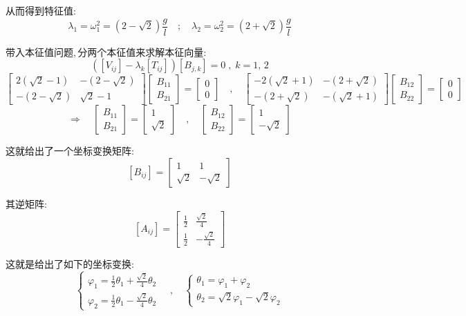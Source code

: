 从而得到特征值:
\[\lambda_1=\omega_1^2=(2-\sqrt{2})\frac{g}{l}\quad;\quad\lambda_2=\omega_2^2=(2+\sqrt{2})\frac{g}{l}\]

带入本征值问题,\,分两个本征值来求解本征向量:
\[([V_{ij}]-\lambda_k [T_{ij}])[B_{j,k}]=0\;,\;k=1,\,2\]
\[\begin{bmatrix}2(\sqrt{2}-1)&-(2-\sqrt{2})\\-(2-\sqrt{2})&\sqrt{2}-1\end{bmatrix}\begin{bmatrix}B_{11}\\B_{21}\end{bmatrix}=\begin{bmatrix}0\\0\end{bmatrix}  \quad,\quad  \begin{bmatrix}-2(\sqrt{2}+1)&-(2+\sqrt{2})\\-(2+\sqrt{2})&-(\sqrt{2}+1)\end{bmatrix}\begin{bmatrix}B_{12}\\B_{22}\end{bmatrix}=\begin{bmatrix}0\\0\end{bmatrix}\]
\[\Rightarrow \quad \begin{bmatrix}B_{11}\\B_{21}\end{bmatrix}=\begin{bmatrix}1\\\sqrt{2}\end{bmatrix}\quad,\quad \begin{bmatrix}B_{12}\\B_{22}\end{bmatrix}=\begin{bmatrix}1\\-\sqrt{2}\end{bmatrix}\]

这就给出了一个坐标变换矩阵:
\[[B_{ij}]=\begin{bmatrix}1&1\\\sqrt{2}&-\sqrt{2}\end{bmatrix}\]

其逆矩阵:
\[[A_{ij}]=\begin{bmatrix}\frac{1}{2}&\frac{\sqrt{2}}{4}\\\frac{1}{2}&-\frac{\sqrt{2}}{4}\end{bmatrix}\]

这就是给出了如下的坐标变换:
\[\left\{\begin{array}{l}\varphi_1=\frac{1}{2}\theta_1+\frac{\sqrt{2}}{4}\theta_2\\ \varphi_2=\frac{1}{2}\theta_1-\frac{\sqrt{2}}{4}\theta_2\end{array}\right.\quad,\quad \left\{\begin{array}{l}\theta_1=\varphi_1+\varphi_2\\ \theta_2=\sqrt{2}\varphi_1-\sqrt{2}\varphi_2\end{array}\right.\]

